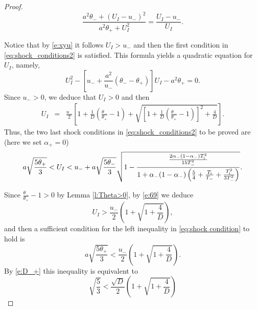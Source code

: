 \documentclass[10pt,a4paper]{article}
\numberwithin{equation}{section}
\newcommand{\Ti}{T_{\rm i}}
\begin{document}
\begin{proof}
\begin{equation}
 \frac{a^2\theta_- + (U_I - u_-)^2}{a^2\theta_+ + U_I^2}   = \frac{U_I - u_-}{U_I}.
\end{equation}
\par
Notice that by \eqref{e:xyu} it follows $U_I > u_-$ and then the first condition in \eqref{eq:shock_conditions2} is satisfied. 
This formula yields a quadratic equation for $U_I$, namely,
$$
  U_I^2 -\left[u_- + \frac{a^2}{u_- }(\theta_- - \theta_+)\right]U_I - a^2\theta_+= 0.
$$
Since $u_- >0$, we deduce that $U_I>0$ and then
\begin{eqnarray}\label{eq:U_I}
  U_I %
  &=&  \frac{u_-}{2}\left[{\textstyle1 + \frac{1}{D}\left(\frac{\theta_-}{\theta_+} - 1\right) + \sqrt{\left[ 1 + \frac{1}{D}\left(\frac{\theta_-}{\theta_+} - 1\right)\right]^{\! 2} + {\textstyle \frac{4}{D}}}}\right].\label{e:69}
\end{eqnarray}
Thus, the two last shock conditions in \eqref{eq:shock_conditions2} 
to be proved are (here we set $\alpha_+=0$)
\begin{equation}\label{eq:shock condition}
 a\sqrt{\frac{5\theta_+}{3}} <
  U_I  < u_- + a\sqrt{\frac{5\theta_-}{3}}\sqrt{ 1 - \frac{\frac{2\alpha_-(1 - \alpha_-)\Ti^2}{15T_-^2}}{1 + \alpha_-(1 - \alpha_-)\left(\frac{5}{4} + \frac{\Ti}{T_-} + \frac{\Ti^2}{3T_-^2}\right)}}.
\end{equation} 
\par
Since $\frac{\theta_-}{\theta_+} - 1>0$ by Lemma \ref{l:Theta>0}, by \eqref{e:69} we deduce
$$
 U_I > \frac{u_-}{2}\left(1 + \sqrt{1 + \frac{4}{D}}\right),
$$
and then a sufficient condition for the left inequality in \eqref{eq:shock condition} to hold is
$$
 a\sqrt{\frac{5\theta_+}{3}} <  \frac{u_-}{2}\left( 1 + \sqrt{1 + \frac{4}{D}}\right).
$$
By \eqref{e:D_+} this inequality is equivalent to 
$$%
 \sqrt{\frac{5}{3}} <  \frac{\sqrt{D}}{2}\left( 1 + \sqrt{1 + \frac{4}{D}}\right)
$$
\end{proof}
\end{document}
